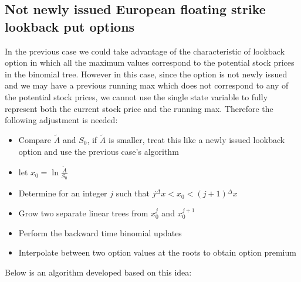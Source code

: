\subsection{Not newly issued European floating strike lookback put options}
In the previous case we could take advantage of the characteristic of lookback option in which all the maximum values correspond to the potential stock prices in the binomial tree. However in this case, since the option is not newly issued and we may have a previous running max which does not correspond to any of the potential stock prices, we cannot use the single state variable to fully represent both the current stock price and the running max. Therefore the following adjustment is needed:
\begin{itemize}
	\item Compare $\tilde{A}$ and $S_{0}$, if $\tilde{A}$ is smaller, treat this like a newly issued lookback option and use the previous case's algorithm
	\item let $x_{0} = \ln \frac{\tilde{A}}{S_{0}}$
	\item Determine for an integer $j$ such that $j{^{\Delta}x} < x_{0} < (j+1){^{\Delta}x}$
	\item Grow two separate linear trees from $x_{0}^{j}$ and $x_{0}^{j+1}$
	\item Perform the backward time binomial updates
	\item Interpolate between two option values at the roots to obtain option premium
\end{itemize}
Below is an algorithm developed based on this idea:

